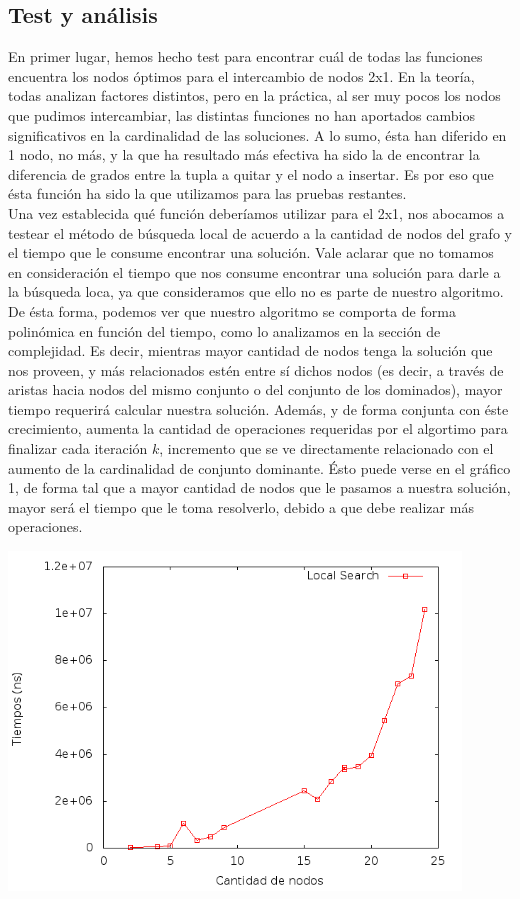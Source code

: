 \subsection{Test y análisis}
En primer lugar, hemos hecho test para encontrar cuál de todas las funciones encuentra los nodos óptimos para el intercambio de nodos 2x1. En la teoría, todas analizan factores distintos, pero en la práctica, al ser muy pocos los nodos que pudimos intercambiar, las distintas funciones no han aportados cambios significativos en la cardinalidad de las soluciones. A lo sumo, ésta han diferido en 1 nodo, no más, y la que ha resultado más efectiva ha sido la de encontrar la diferencia de grados entre la tupla a quitar y el nodo a insertar. Es por eso que ésta función ha sido la que utilizamos para las pruebas restantes. \\
Una vez establecida qué función deberíamos utilizar para el 2x1, nos abocamos a testear el método de búsqueda local de acuerdo a la cantidad de nodos del grafo y el tiempo que le consume encontrar una solución. Vale aclarar que no tomamos en consideración el tiempo que nos consume encontrar una solución para darle a la búsqueda loca, ya que consideramos que ello no es parte de nuestro algoritmo. De ésta forma, podemos ver que nuestro algoritmo se comporta de forma polinómica en función del tiempo, como lo analizamos en la sección de complejidad. Es decir, mientras mayor cantidad de nodos tenga la solución que nos proveen, y más relacionados estén entre sí dichos nodos (es decir, a través de aristas hacia nodos del mismo conjunto o del conjunto de los dominados), mayor tiempo requerirá calcular nuestra solución. Además, y de forma conjunta con éste crecimiento, aumenta la cantidad de operaciones requeridas por el algortimo para finalizar cada iteración $k$, incremento que se ve directamente relacionado con el aumento de la cardinalidad de conjunto dominante. Ésto puede verse en el gráfico 1, de forma tal que a mayor cantidad de nodos que le pasamos a nuestra solución, mayor será el tiempo que le toma resolverlo, debido a que debe realizar más operaciones.

\begin{center}
\includegraphics[width=12cm]{./graficos/tiempoLocalSearch.png}
\end{center}

